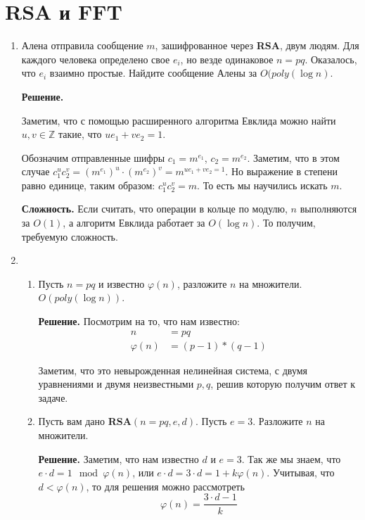 \section*{RSA и FFT}
\begin{enumerate}
	\item Алена отправила сообщение $m$, зашифрованное через \textbf{RSA}, двум людям. Для каждого человека 
	определено свое $e_i$, но везде одинаковое $n = pq$. Оказалось, что $e_i$ взаимно простые. Найдите сообщение 
	Алены за $O(poly(\log n)$.
	
	\textbf{Решение.} 
	
	Заметим, что с помощью расширенного алгоритма Евклида можно найти $u, v \in \mathbb{Z}$ такие, что $ue_1 + 
	ve_2 = 1$.
	
	Обозначим отправленные шифры $c_1 = m^{e_1}$, $c_2 = m^{e_2}$. Заметим, что в этом случае $c_1^u c_2^v = 
	(m^{e_1})^u\cdot(m^{e_2})^v = m^{ue_1 + ve_2 = 1}$. Но выражение в степени равно единице, таким образом: 
	$c_1^u c_2^v = m$. То есть мы научились искать $m$.
	
 	\textbf{Сложность.} Если считать, что операции в кольце по модулю, $n$ выполняются за $O(1)$, а алгоритм 
 	Евклида работает за $O(\log n)$. То получим, требуемую сложность.
	
	\item 
	\begin{enumerate}
		\item Пусть $n = pq$ и известно $\varphi(n)$, разложите $n$ на множители. $O(poly(\log n))$.
		
		\textbf{Решение.} Посмотрим на то, что нам известно:
		\begin{align*}
			n &= pq \\
			\varphi(n) &= (p - 1) * (q - 1)
		\end{align*} 
		
		Заметим, что это невырожденная нелинейная система, с двумя уравнениями и двумя неизвестными $p, q$, решив которую получим ответ к задаче. 
			
		\item Пусть вам дано \textbf{RSA}$(n = pq, e, d)$. Пусть $e = 3$. Разложите $n$ на множители.
		
		\textbf{Решение.}
		Заметим, что нам известно $d$ и $e = 3$. Так же мы знаем, что $e\cdot d = 1\mod \varphi(n)$, или $e\cdot d = 3\cdot d = 1 + k \varphi(n)$. Учитывая, что $d < \varphi(n)$, то для решения можно рассмотреть
		\begin{equation*}
			\varphi(n) = \frac{3\cdot d - 1}{k}
		\end{equation*}
		

\end{enumerate}
\end{enumerate}
